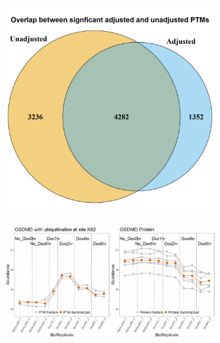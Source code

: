 \documentclass[mcp]{article}
\numberwithin{table}{section}
\begin{document}
\begin{figure}[ht]
\centering
\begin{subfigure}[c]{0.5\linewidth}
\includegraphics[width=1\textwidth]{images/ipah_venn_diagramm.png}
\caption{}
\label{fig:data4_venn_diagram}
\end{subfigure}
\begin{subfigure}[c]{0.95\linewidth}
\includegraphics[width=1\textwidth]{images/IpaH_prof_plot.png}
\caption{}
\label{fig:data4_profile_plot}
\end{subfigure}

\end{figure}
\end{document}
